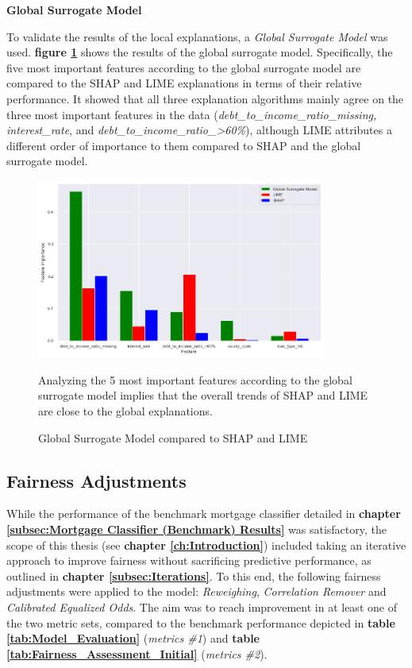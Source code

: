 \textbf{Global Surrogate Model}

To validate the results of the local explanations, a \textit{Global Surrogate Model} was used. \textbf{figure \ref{fig:Global_Surrogate}} shows the results of the global surrogate model. Specifically, the five most important features according to the global surrogate model are compared to the SHAP and LIME explanations in terms of their relative performance.
It showed that all three explanation algorithms mainly agree on the three most important features in the data (\textit{debt\_to\_income\_ratio\_missing, interest\_rate}, and \textit{debt\_to\_income\_ratio\_>60\%}), although LIME attributes a different order of importance to them compared to SHAP and the global surrogate model.

\begin{figure}[!htbp]
    \centering
    \includegraphics[width=0.85\textwidth]{images/CHXX_UPDATE_Surrogate_SHAP_LIME_combined.png}
    \caption{Global Surrogate Model compared to SHAP and LIME}
    \medskip
    \small
    Analyzing the 5 most important features according to the global surrogate model implies that the overall trends of SHAP and LIME are close to the global explanations.
    \label{fig:Global_Surrogate}
\end{figure}

\subsection{Fairness Adjustments}\label{Fairness Adjustments Results}

While the performance of the benchmark mortgage classifier detailed in \textbf{chapter \ref{subsec:Mortgage Classifier (Benchmark) Results}} was satisfactory, the scope of this thesis (see \textbf{chapter \ref{ch:Introduction}}) included taking an iterative approach to improve fairness without sacrificing predictive performance, as outlined in \textbf{chapter \ref{subsec:Iterations}}.
To this end, the following fairness adjustments were applied to the model: \textit{Reweighing}, \textit{Correlation Remover} and \textit{Calibrated Equalized Odds}. The aim was to reach improvement in at least one of the two metric sets, compared to the benchmark performance depicted in \textbf{table \ref{tab:Model_Evaluation}} (\textit{metrics \#1}) and \textbf{table \ref{tab:Fairness_Assessment_Initial}} (\textit{metrics \#2}).

